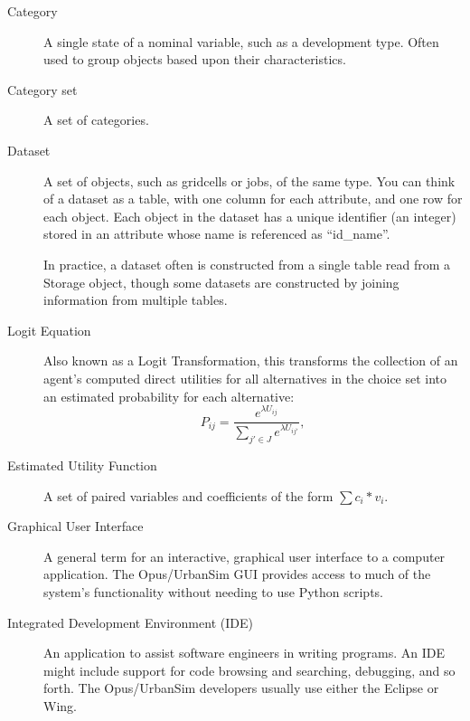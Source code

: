 \begin{description}
\item[Category] 
A single state of a nominal variable, such as a development type.
Often used to group objects based upon their characteristics. 

\item[Category set] 
A set of categories.

\item[Dataset]
A set of objects, such as gridcells or jobs, of the same type.
You can think of a dataset as a table, with one column
for each attribute, and one row for each object.  
Each object in the dataset has a unique identifier (an integer) stored in
an attribute whose name is referenced as ``id_name''.  

In practice, a dataset often is constructed from a single
table read from a Storage object, though some datasets 
are constructed by joining information from multiple tables.

\item[Logit Equation] 
Also known as a Logit Transformation, this transforms the
collection of an agent's computed direct utilities for all
alternatives in the choice set into an estimated probability for
each alternative:
\begin{equation}
    P_{ij}=\frac{e^{\lambda U_{ij}}}{\sum_{j' \in J}e^{\lambda
    U_{ij'}}},
\end{equation}

\item[Estimated Utility Function] 
A set of paired variables and coefficients of the form $\sum
c_{i}*v_{i}$.

\item[Graphical User Interface]
A general term for an interactive, graphical user interface to a computer
application.  The Opus/UrbanSim GUI provides access to much of the system's
functionality without needing to use Python scripts.

\item[Integrated Development Environment (IDE)]
An application to assist software engineers in writing programs.  An IDE might 
include support for code browsing and searching, debugging, and so forth.
The Opus/UrbanSim developers usually use either the 
Eclipse or 
Wing\@.


\end{description}
